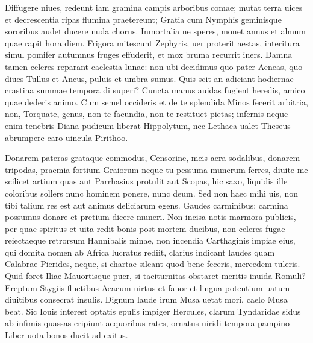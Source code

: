 \documentclass{book}
\newenvironment {carmen} [1] [\relax] 
  {\Titulus \Versus \incipit*\numerus{1}#1}
  {\endVersus}
\newcommand {\ArchI}     {\Forma \strophae {0 \poena 3}}
\begin{document}
\begin{carmen}[\ArchI]


Diffugere niues, redeunt iam gramina campis 
      arboribus comae;
 mutat terra uices et decrescentia ripas
      flumina praetereunt;
 Gratia cum Nymphis geminisque sororibus audet               
      ducere nuda chorus.
 Inmortalia ne speres, monet annus et almum
      quae rapit hora diem.
 Frigora mitescunt Zephyris, uer proterit aestas,
      interitura simul               
 pomifer autumnus fruges effuderit, et mox
      bruma recurrit iners.
 Damna tamen celeres reparant caelestia lunae:
      non ubi decidimus
 quo pater Aeneas, quo diues Tullus et Ancus,               
      puluis et umbra sumus.
 Quis scit an adiciant hodiernae crastina summae
      tempora di superi?
 Cuncta manus auidas fugient heredis, amico
      quae dederis animo.               
 Cum semel occideris et de te splendida Minos
      fecerit arbitria,
 non, Torquate, genus, non te facundia, non te
      restituet pietas;
 infernis neque enim tenebris Diana pudicum               
      liberat Hippolytum,
 nec Lethaea ualet Theseus abrumpere caro
      uincula Pirithoo.
 

\end{carmen}

\begin{carmen}


Donarem pateras grataque commodus,
 Censorine, meis aera sodalibus,
 donarem tripodas, praemia fortium
 Graiorum neque tu pessuma munerum
 ferres, diuite me scilicet artium               
 quas aut Parrhasius protulit aut Scopas,
 hic saxo, liquidis ille coloribus
 sollers nunc hominem ponere, nunc deum.
 Sed non haec mihi uis, non tibi talium
 res est aut animus deliciarum egens.               
 Gaudes carminibus; carmina possumus
 donare et pretium dicere muneri.
 Non incisa notis marmora publicis,
 per quae spiritus et uita redit bonis
 post mortem ducibus, non celeres fugae                
reiectaeque retrorsum Hannibalis minae,
 non incendia Carthaginis impiae
 eius, qui domita nomen ab Africa
 lucratus rediit, clarius indicant
 laudes quam Calabrae Pierides, neque,               
 si chartae sileant quod bene feceris,
 mercedem tuleris. Quid foret Iliae
 Mauortisque puer, si taciturnitas
 obstaret meritis inuida Romuli?
 Ereptum Stygiis fluctibus Aeacum               
 uirtus et fauor et lingua potentium
 uatum diuitibus consecrat insulis.
 Dignum laude irum Musa uetat mori,
 caelo Musa beat. Sic Iouis interest
 optatis epulis impiger Hercules,               
 clarum Tyndaridae sidus ab infimis
 quassas eripiunt aequoribus rates,
 ornatus uiridi tempora pampino
 Liber uota bonos ducit ad exitus.
 
\end{carmen}
\end{document}
